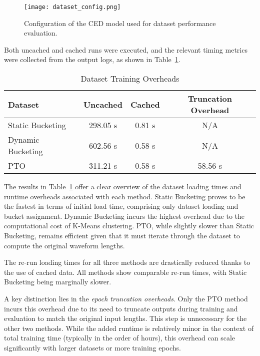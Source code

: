 \begin{figure}[H]
    \centering
    \texttt{[image: dataset\_config.png]}
    \caption{\label{fig:dataset_config} Configuration of the CED model used for dataset performance evaluation.}
\end{figure}

Both uncached and cached runs were executed, and the relevant timing metrics were collected from the output logs, as shown in Table~\ref{tab:dataset_loading_times}.

\vspace{1em}
\begin{table}[H]
\centering
\caption{Dataset Training Overheads}
\label{tab:dataset_loading_times}
\begin{tabular}{|l|c|c|c|}
\hline
\textbf{Dataset} & \textbf{Uncached} & \textbf{Cached} & \textbf{Truncation Overhead} \\
\hline
Static Bucketing  & 298.05 s  & 0.81 s   & N/A    \\
Dynamic Bucketing & 602.56 s& 0.58 s  & N/A    \\
PTO               & 311.21 s & 0.58 s  & 58.56 s  \\
\hline
\end{tabular}
\end{table}

The results in Table~\ref{tab:dataset_loading_times} offer a clear overview of the dataset loading times and runtime overheads associated with each method. Static Bucketing proves to be the fastest in terms of initial load time, comprising only dataset loading and bucket assignment. Dynamic Bucketing incurs the highest overhead due to the computational cost of K-Means clustering. PTO, while slightly slower than Static Bucketing, remains efficient given that it must iterate through the dataset to compute the original waveform lengths.

The re-run loading times for all three methods are drastically reduced thanks to the use of cached data. All methods show comparable re-run times, with Static Bucketing being marginally slower.

A key distinction lies in the \textit{epoch truncation overheads}. Only the PTO method incurs this overhead due to its need to truncate outputs during training and evaluation to match the original input lengths. This step is unnecessary for the other two methods. While the added runtime is relatively minor in the context of total training time (typically in the order of hours), this overhead can scale significantly with larger datasets or more training epochs.

